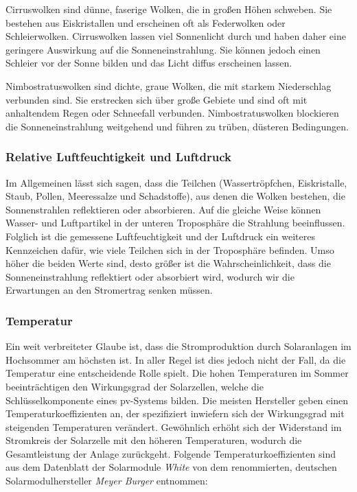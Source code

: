 \documentclass[12pt, a4paper]{article}
\begin{document}
Cirruswolken sind dünne, faserige Wolken, die in großen Höhen schweben. Sie bestehen aus Eiskristallen und erscheinen oft als Federwolken oder Schleierwolken. Cirruswolken lassen viel Sonnenlicht durch und haben daher eine geringere Auswirkung auf die Sonneneinstrahlung. Sie können jedoch einen Schleier vor der Sonne bilden und das Licht diffus erscheinen lassen.

Nimbostratuswolken sind dichte, graue Wolken, die mit starkem Niederschlag verbunden sind. Sie erstrecken sich über große Gebiete und sind oft mit anhaltendem Regen oder Schneefall verbunden. Nimbostratuswolken blockieren die Sonneneinstrahlung weitgehend und führen zu trüben, düsteren Bedingungen.

\subsubsection{Relative Luftfeuchtigkeit und Luftdruck}

Im Allgemeinen lässt sich sagen, dass die Teilchen (Wassertröpfchen, Eiskristalle, Staub, Pollen, Meeressalze und Schadstoffe), aus denen die Wolken bestehen, die Sonnenstrahlen reflektieren oder absorbieren. Auf die gleiche Weise können Wasser- und Luftpartikel in der unteren Troposphäre die Strahlung beeinflussen. Folglich ist die gemessene Luftfeuchtigkeit und der Luftdruck ein weiteres Kennzeichen dafür, wie viele Teilchen sich in der Troposphäre befinden. Umso höher die beiden Werte sind, desto größer ist die Wahrscheinlichkeit, dass die Sonneneinstrahlung reflektiert oder absorbiert wird, wodurch wir die Erwartungen an den Stromertrag senken müssen. 

\subsubsection{Temperatur}

Ein weit verbreiteter Glaube ist, dass die Stromproduktion durch Solaranlagen im Hochsommer am höchsten ist. In aller Regel ist dies jedoch nicht der Fall, da die Temperatur eine entscheidende Rolle spielt. Die hohen Temperaturen im Sommer beeinträchtigen den Wirkungsgrad der Solarzellen, welche die Schlüsselkomponente eines \ac{pv}-Systems bilden. Die meisten Hersteller geben einen Temperaturkoeffizienten an, der spezifiziert inwiefern sich der Wirkungsgrad mit steigenden Temperaturen verändert. Gewöhnlich erhöht sich der Widerstand im Stromkreis der Solarzelle mit den höheren Temperaturen, wodurch die Gesamtleistung der Anlage zurückgeht. Folgende Temperaturkoeffizienten sind aus dem Datenblatt der Solarmodule \textit{White} von dem renommierten, deutschen Solarmodulhersteller \textit{Meyer Burger} entnommen: \newline
\end{document}
